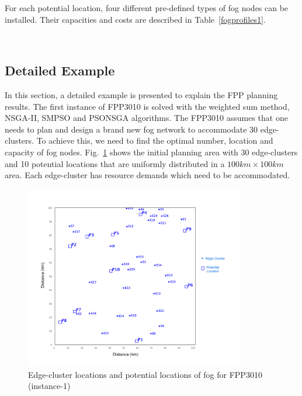 \documentclass[10pt,journal,compsoc]{IEEEtran}
\newcommand{\Fig}[1]{Fig.~\ref{#1}}
\begin{document}
For each potential location, four different pre-defined types of fog nodes can be installed. Their capacities and costs are described in Table~\ref{fogprofiles1}.

\begin{table}[tbh]
\caption{Fog Profiles}
\label{fogprofiles1}
\\
\end{table}


\subsection{Detailed Example}
In this section, a detailed example is presented to explain the FPP planning results. The first instance of FPP3010 is solved with the weighted sum method, NSGA-II, SMPSO and PSONSGA algorithms. The FPP3010 assumes that one needs to plan and design a brand new fog network to accommodate 30 edge-clusters. To achieve this, we need to find the optimal number, location and capacity of fog nodes. \Fig{nettopology} shows the initial planning area with 30 edge-clusters and 10 potential locations that are uniformly distributed in a $100km \times 100km$ area. 
Each edge-cluster has resource demands which need to be accommodated. 

\begin{figure}[ht] %
\centerline{\includegraphics[trim=0 50 0 50,clip,width=3.8in]{100x100problem.png}}
\caption{Edge-cluster locations and potential locations of fog for FPP3010 (instance-1)} 
\label{nettopology}
\end{figure}
\end{document}
